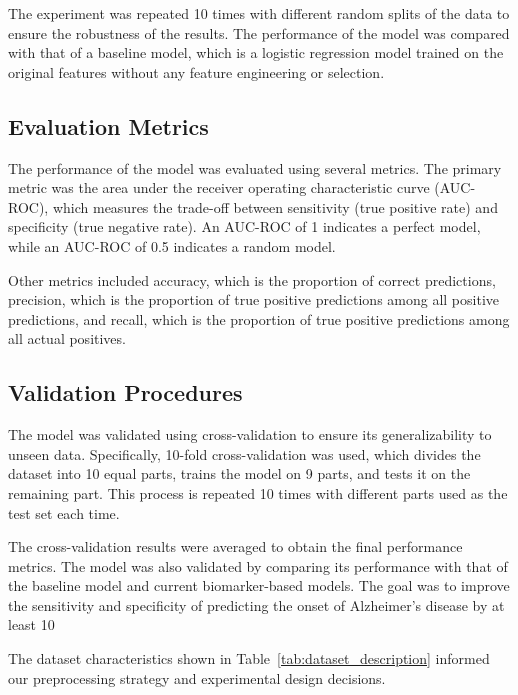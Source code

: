 \documentclass[conference]{IEEEtran}
\begin{document}
The experiment was repeated 10 times with different random splits of the data to ensure the robustness of the results. The performance of the model was compared with that of a baseline model, which is a logistic regression model trained on the original features without any feature engineering or selection.

\subsection{Evaluation Metrics}
The performance of the model was evaluated using several metrics. The primary metric was the area under the receiver operating characteristic curve (AUC-ROC), which measures the trade-off between sensitivity (true positive rate) and specificity (true negative rate). An AUC-ROC of 1 indicates a perfect model, while an AUC-ROC of 0.5 indicates a random model.

Other metrics included accuracy, which is the proportion of correct predictions, precision, which is the proportion of true positive predictions among all positive predictions, and recall, which is the proportion of true positive predictions among all actual positives.

\subsection{Validation Procedures}
The model was validated using cross-validation to ensure its generalizability to unseen data. Specifically, 10-fold cross-validation was used, which divides the dataset into 10 equal parts, trains the model on 9 parts, and tests it on the remaining part. This process is repeated 10 times with different parts used as the test set each time.

The cross-validation results were averaged to obtain the final performance metrics. The model was also validated by comparing its performance with that of the baseline model and current biomarker-based models. The goal was to improve the sensitivity and specificity of predicting the onset of Alzheimer's disease by at least 10%

The dataset characteristics shown in Table~\ref{tab:dataset_description} informed our preprocessing strategy and experimental design decisions.
\end{document}
